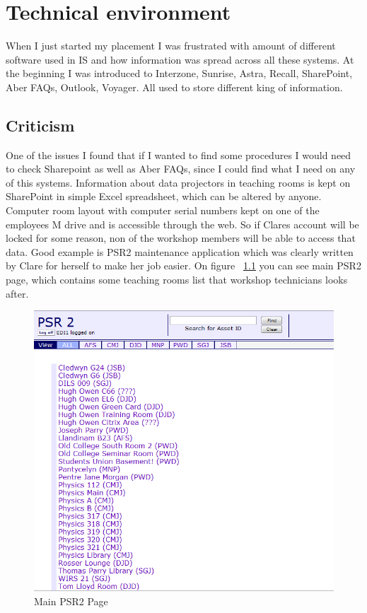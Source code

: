 \documentclass[10pt,a4paper,headinclude=true]{report}
\begin{document}
\chapter{Technical environment}
When I just started my placement I was frustrated with amount of different software used in IS and how information was spread across all these systems. At the beginning I was introduced to Interzone, Sunrise, Astra, Recall, SharePoint, Aber FAQs, Outlook, Voyager. All used to store different king of information.

\section{Criticism}One of the issues I found that if I wanted to find some procedures I would need to check Sharepoint as well as Aber FAQs, since I could find what I need on any of this systems. Information about data projectors in teaching rooms is kept on SharePoint in simple Excel spreadsheet, which can be altered by anyone. Computer room layout with computer serial numbers kept on one of the employees M drive and is accessible through the web. So if Clares account will be locked for some reason, non of the workshop members will be able to access that data. Good example is PSR2 maintenance application which was clearly written by Clare for herself to make her job easier. On figure ~\ref{fig:main_PSR2_page} you can see main PSR2 page, which contains some teaching rooms list that workshop technicians looks after.

\begin{figure}[H]
\centering
\centerline{\includegraphics[scale=0.3]{./PSR2}}
\caption{Main PSR2 Page}
\label{fig:main_PSR2_page}
\end{figure}
\end{document}
